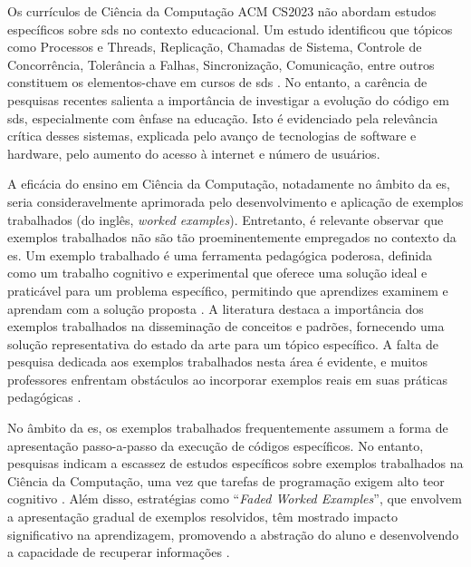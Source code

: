 Os currículos de Ciência da Computação ACM CS2023 \cite{CS2023:ACM} não abordam estudos específicos sobre \gls{sds} no contexto educacional. Um estudo identificou que tópicos como Processos e Threads, Replicação, Chamadas de Sistema, Controle de Concorrência, Tolerância a Falhas, Sincronização, Comunicação, entre outros constituem os elementos-chave em cursos de \gls{sds} \cite{HaveWeReachedConsensus}. No entanto, a carência de pesquisas recentes salienta a importância de investigar a evolução do código em \gls{sds}, especialmente com ênfase na educação. Isto é evidenciado pela relevância crítica desses sistemas, explicada pelo avanço de tecnologias de software e hardware, pelo aumento do acesso à internet e número de usuários.

A eficácia do ensino em Ciência da Computação, notadamente no âmbito da \gls{es}, seria consideravelmente aprimorada pelo desenvolvimento e aplicação de exemplos trabalhados (do inglês, \textit{worked examples}). Entretanto, é relevante observar que exemplos trabalhados não são tão proeminentemente empregados no contexto da \gls{es}. Um exemplo trabalhado é uma ferramenta pedagógica poderosa, definida como um trabalho cognitivo e experimental que oferece uma solução ideal e praticável para um problema específico, permitindo que aprendizes examinem e aprendam com a solução proposta \cite{Robert.Atkinson-etal:2000}. A literatura destaca a importância dos exemplos trabalhados na disseminação de conceitos e padrões, fornecendo uma solução representativa do estado da arte para um tópico específico. A falta de pesquisa dedicada aos exemplos trabalhados nesta área é evidente, e muitos professores enfrentam obstáculos ao incorporar exemplos reais em suas práticas pedagógicas \cite{Simone.Tonhao-etal:2021}.

No âmbito da \gls{es}, os exemplos trabalhados frequentemente assumem a forma de apresentação passo-a-passo da execução de códigos específicos. No entanto, pesquisas indicam a escassez de estudos específicos sobre exemplos trabalhados na Ciência da Computação, uma vez que tarefas de programação exigem alto teor cognitivo \cite{Skudder-LuxtonReilly:2014}. Além disso, estratégias como ``\textit{Faded Worked Examples}'', que envolvem a apresentação gradual de exemplos resolvidos, têm mostrado impacto significativo na aprendizagem, promovendo a abstração do aluno e desenvolvendo a capacidade de recuperar informações \cite{Skudder-LuxtonReilly:2014}.

